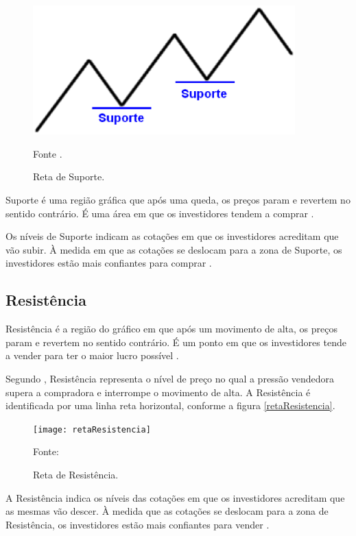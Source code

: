 \begin{figure}
\centering
\includegraphics[width=0.9\textwidth]{figuras/retaSuporte}
\caption{Reta de Suporte.}{Fonte .}
\label{retaSuporte}
\end{figure}

Suporte é uma região gráfica que após uma queda, os preços param e revertem no sentido contrário. É uma área em que os investidores tendem a comprar \cite[p~97]{debastini2008}.

Os níveis de Suporte indicam as cotações em que os investidores acreditam que vão subir. À medida em que as cotações se deslocam para a zona de Suporte, os investidores estão mais confiantes para comprar \cite{collins2012}.

\subsection{Resistência}

Resistência é a região do gráfico em que após um movimento de alta, os preços param e revertem no sentido contrário. É um ponto em que os investidores tende a vender para ter o maior lucro possível \cite[p.~98]{debastini2008}.

Segundo , Resistência representa o nível de preço no qual a pressão vendedora supera a compradora e interrompe o movimento de alta. A Resistência é identificada por uma linha reta horizontal, conforme a figura \ref{retaResistencia}.

\graphicspath{{figuras/}}
\begin{figure}[H]
\centering
\texttt{[image: retaResistencia]}
\caption{Reta de Resistência.}{Fonte: } 
\label{scrum-estrutura}
\end{figure}

A Resistência indica os níveis das cotações em que os investidores acreditam que as mesmas vão descer. À medida que as cotações se deslocam para a zona de Resistência, os investidores estão mais confiantes para vender \cite{collins2012}.